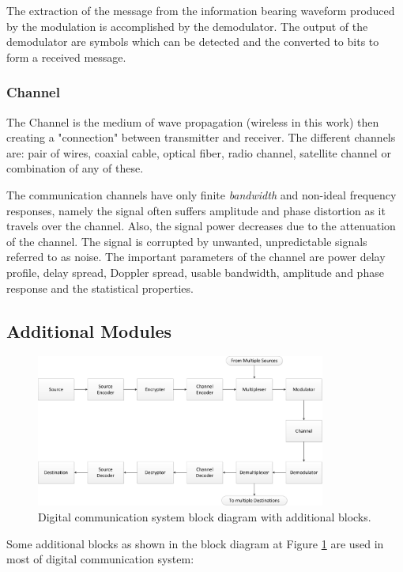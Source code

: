 The extraction of the message from the information bearing waveform produced by
the modulation is accomplished by the demodulator. The output of the demodulator
are symbols which can be detected and the converted to bits to form a received
message.

\subsubsection{Channel}

The Channel is the medium of wave propagation (wireless in this work) then
creating a "connection" between transmitter and receiver. The different channels
are: pair of wires, coaxial cable, optical fiber, radio channel, satellite
channel or combination of any of these.

The communication channels have only finite \emph{bandwidth} and non-ideal
frequency responses, namely the signal often suffers amplitude and phase
distortion as it travels over the channel. Also, the signal power decreases due
to the attenuation of the channel. The signal is corrupted by unwanted,
unpredictable signals referred to as noise. The important parameters of the
channel are power delay profile, delay spread, Doppler spread, usable bandwidth,
amplitude and phase response and the statistical properties.

\subsection{Additional Modules}

\begin{figure}[htbp]
    \centering
    \includegraphics[width=0.85\textwidth]{./figures/digicom_plus}
    \caption{ Digital communication system block diagram with additional blocks.
    \label{fig:digicomplus}}
\end{figure}

Some additional blocks as shown in the block diagram  at Figure \ref{fig:digicomplus}
are used in most of digital communication system:


